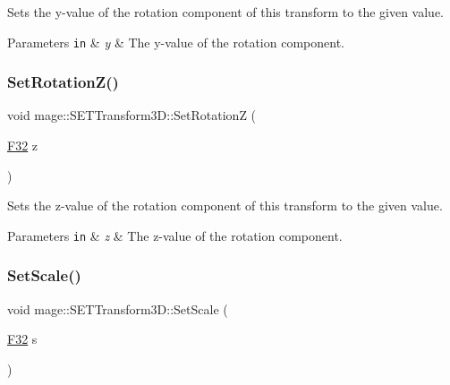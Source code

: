 Sets the y-\/value of the rotation component of this transform to the given value.


\begin{DoxyParams}[1]{Parameters}
\mbox{\tt in}  & {\em y} & The y-\/value of the rotation component. \\
\hline
\end{DoxyParams}
\mbox{\label{classmage_1_1_s_e_t_transform3_d_a5e82593216de38f66df664b92985abed}} 
\subsubsection{\texorpdfstring{Set\+Rotation\+Z()}{SetRotationZ()}}
{\footnotesize\ttfamily void mage\+::\+S\+E\+T\+Transform3\+D\+::\+Set\+RotationZ (\begin{DoxyParamCaption}\item[{\mbox{\hyperlink{namespacemage_aa97e833b45f06d60a0a9c4fc22ae02c0}{F32}}}]{z }\end{DoxyParamCaption})\hspace{0.3cm}{\ttfamily [noexcept]}}

Sets the z-\/value of the rotation component of this transform to the given value.


\begin{DoxyParams}[1]{Parameters}
\mbox{\tt in}  & {\em z} & The z-\/value of the rotation component. \\
\hline
\end{DoxyParams}
\mbox{\label{classmage_1_1_s_e_t_transform3_d_a4954b77cfef4a437a09ce9902a284dcf}} 
\subsubsection{\texorpdfstring{Set\+Scale()}{SetScale()}\hspace{0.1cm}{\footnotesize\ttfamily [1/4]}}
{\footnotesize\ttfamily void mage\+::\+S\+E\+T\+Transform3\+D\+::\+Set\+Scale (\begin{DoxyParamCaption}\item[{\mbox{\hyperlink{namespacemage_aa97e833b45f06d60a0a9c4fc22ae02c0}{F32}}}]{s }\end{DoxyParamCaption})\hspace{0.3cm}{\ttfamily [noexcept]}}

